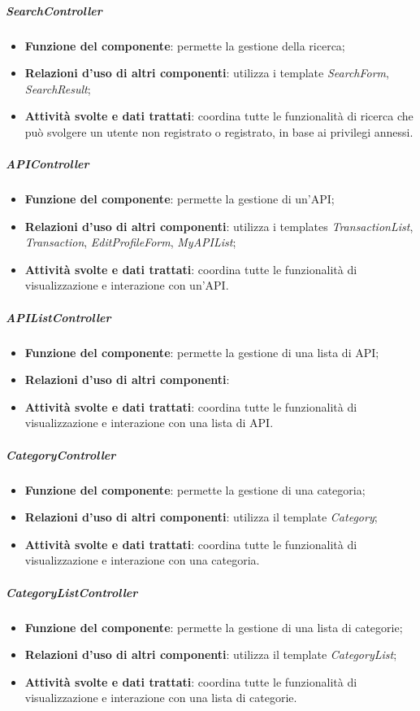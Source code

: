 \subparagraph{SearchController}
\begin{itemize}
	\item \textbf{Funzione del componente}: permette la gestione della ricerca;
	\item \textbf{Relazioni d’uso di altri componenti}: utilizza i template \textit{SearchForm}, \textit{SearchResult};
	\item \textbf{Attività svolte e dati trattati}: coordina tutte le funzionalità di ricerca che può svolgere un utente non registrato o registrato, in base ai privilegi annessi.
\end{itemize}

\subparagraph{APIController}
\begin{itemize}
	\item \textbf{Funzione del componente}: permette la gestione di un'API;
	\item \textbf{Relazioni d’uso di altri componenti}: utilizza i templates \textit{TransactionList}, \textit{Transaction}, \textit{EditProfileForm}, \textit{MyAPIList};
	\item \textbf{Attività svolte e dati trattati}: coordina tutte le funzionalità di visualizzazione e interazione con un'API.
\end{itemize}

\subparagraph{APIListController}
\begin{itemize}
	\item \textbf{Funzione del componente}: permette la gestione di una lista di API;
	\item \textbf{Relazioni d’uso di altri componenti}: 
	\item \textbf{Attività svolte e dati trattati}: coordina tutte le funzionalità di visualizzazione e interazione con una lista di API.
\end{itemize}

\subparagraph{CategoryController}
\begin{itemize}
	\item \textbf{Funzione del componente}: permette la gestione di una categoria;
	\item \textbf{Relazioni d’uso di altri componenti}: utilizza il template \textit{Category};
	\item \textbf{Attività svolte e dati trattati}: coordina tutte le funzionalità di visualizzazione e interazione con una categoria.
\end{itemize}

\subparagraph{CategoryListController}
\begin{itemize}
	\item \textbf{Funzione del componente}: permette la gestione di una lista di categorie;
	\item \textbf{Relazioni d’uso di altri componenti}: utilizza il template \textit{CategoryList};
	\item \textbf{Attività svolte e dati trattati}: coordina tutte le funzionalità di visualizzazione e interazione con una lista di categorie.
\end{itemize}

